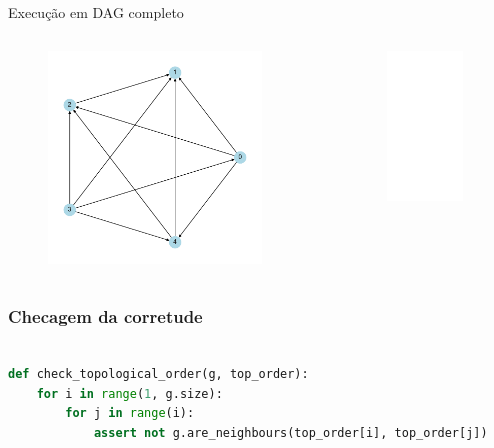 \documentclass[aspectratio=169,usenames,dvipsnames]{beamer}
\begin{document}
\begin{frame}{Execução em DAG completo}

  \begin{columns}[t]
  \begin{figure}[ht]
  \centering
  \includegraphics[width=0.9\textwidth]{figs/dag_complete_5.pdf}
  \end{figure}
  \vfill
  \begin{figure}[ht]
  \centering
  \includegraphics<2>[width=0.9\textwidth]{figs/dag_complete_top_5.pdf}
  \end{figure}
  \vfill
  \end{columns}
  
\end{frame}

\begin{frame}[fragile]  %
  \frametitle{Checagem da corretude}

      \begin{lstlisting}[language=Python]

def check_topological_order(g, top_order):
    for i in range(1, g.size):
        for j in range(i):
            assert not g.are_neighbours(top_order[i], top_order[j])

      \end{lstlisting}

\end{frame}
\end{document}
